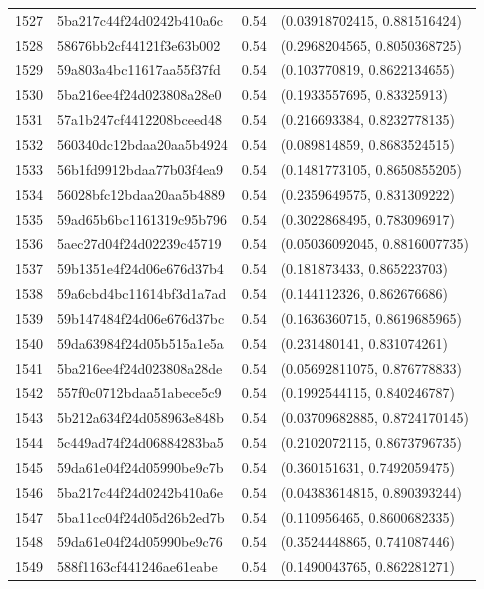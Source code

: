 \begin{table}[ht]
\begin{tabular}{rlrl}
  1527 & 5ba217c44f24d0242b410a6c & 0.54 & (0.03918702415, 0.881516424) \\ 
  1528 & 58676bb2cf44121f3e63b002 & 0.54 & (0.2968204565, 0.8050368725) \\ 
  1529 & 59a803a4bc11617aa55f37fd & 0.54 & (0.103770819, 0.8622134655) \\ 
  1530 & 5ba216ee4f24d023808a28e0 & 0.54 & (0.1933557695, 0.83325913) \\ 
  1531 & 57a1b247cf4412208bceed48 & 0.54 & (0.216693384, 0.8232778135) \\ 
  1532 & 560340dc12bdaa20aa5b4924 & 0.54 & (0.089814859, 0.8683524515) \\ 
  1533 & 56b1fd9912bdaa77b03f4ea9 & 0.54 & (0.1481773105, 0.8650855205) \\ 
  1534 & 56028bfc12bdaa20aa5b4889 & 0.54 & (0.2359649575, 0.831309222) \\ 
  1535 & 59ad65b6bc1161319c95b796 & 0.54 & (0.3022868495, 0.783096917) \\ 
  1536 & 5aec27d04f24d02239c45719 & 0.54 & (0.05036092045, 0.8816007735) \\ 
  1537 & 59b1351e4f24d06e676d37b4 & 0.54 & (0.181873433, 0.865223703) \\ 
  1538 & 59a6cbd4bc11614bf3d1a7ad & 0.54 & (0.144112326, 0.862676686) \\ 
  1539 & 59b147484f24d06e676d37bc & 0.54 & (0.1636360715, 0.8619685965) \\ 
  1540 & 59da63984f24d05b515a1e5a & 0.54 & (0.231480141, 0.831074261) \\ 
  1541 & 5ba216ee4f24d023808a28de & 0.54 & (0.05692811075, 0.876778833) \\ 
  1542 & 557f0c0712bdaa51abece5c9 & 0.54 & (0.1992544115, 0.840246787) \\ 
  1543 & 5b212a634f24d058963e848b & 0.54 & (0.03709682885, 0.8724170145) \\ 
  1544 & 5c449ad74f24d06884283ba5 & 0.54 & (0.2102072115, 0.8673796735) \\ 
  1545 & 59da61e04f24d05990be9c7b & 0.54 & (0.360151631, 0.7492059475) \\ 
  1546 & 5ba217c44f24d0242b410a6e & 0.54 & (0.04383614815, 0.890393244) \\ 
  1547 & 5ba11cc04f24d05d26b2ed7b & 0.54 & (0.110956465, 0.8600682335) \\ 
  1548 & 59da61e04f24d05990be9c76 & 0.54 & (0.3524448865, 0.741087446) \\ 
  1549 & 588f1163cf441246ae61eabe & 0.54 & (0.1490043765, 0.862281271) \\ 

\end{tabular}
\end{table}

